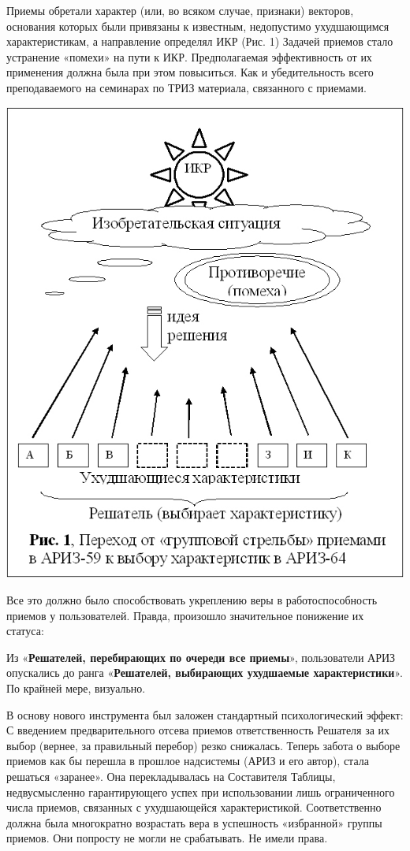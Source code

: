 \documentclass[11pt,a4paper]{article}
\begin{document}
Приемы обретали характер (или, во всяком случае, признаки) векторов, основания
которых были привязаны к известным, недопустимо ухудшающимся характеристикам,
а направление определял ИКР (Рис. 1) Задачей приемов стало устранение «помехи»
на пути к ИКР. Предполагаемая эффективность от их применения должна была при
этом повыситься. Как и убедительность всего преподаваемого на семинарах по
ТРИЗ материала, связанного с приемами.
\begin{center}
  \includegraphics[width=.7\textwidth]{./16.jpg}
\end{center}

Все это должно было способствовать укреплению веры в работоспособность приемов
у пользователей. Правда, произошло значительное понижение их статуса:

Из «\textbf{Решателей, перебирающих по очереди все приемы}», пользователи АРИЗ
опускались до ранга «\textbf{Решателей, выбирающих ухудшаемые
  характеристики}».  По крайней мере, визуально.

В основу нового инструмента был заложен стандартный психологический эффект: С
введением предварительного отсева приемов ответственность Решателя за их выбор
(вернее, за правильный перебор) резко снижалась. Теперь забота о выборе
приемов как бы перешла в прошлое надсистемы (АРИЗ и его автор), стала решаться
«заранее». Она перекладывалась на Составителя Таблицы, недвусмысленно
гарантирующего успех при использовании лишь ограниченного числа приемов,
связанных с ухудшающейся характеристикой. Соответственно должна была
многократно возрастать вера в успешность «избранной» группы приемов. Они
попросту не могли не срабатывать. Не имели права.
\end{document}
